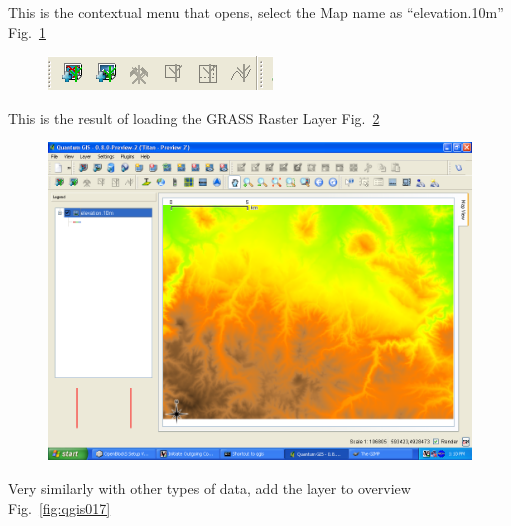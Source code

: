 This is the contextual menu that opens, select the Map name as
``elevation.10m'' Fig.~\ref{fig:qgis015}

\begin{figure}[htbp]
   \centering
   \includegraphics[scale=0.85]{qgis015.png}
   \caption{}
   \label{fig:qgis015}
\end{figure}
 

This is the result of loading the GRASS Raster Layer Fig.~\ref{fig:qgis016}

\begin{figure}[htbp]
   \centering
   \includegraphics[scale=0.2]{qgis016.png}
   \caption{}
   \label{fig:qgis016}
\end{figure}

Very similarly with other types of data, add the layer to overview Fig.~\ref{fig:qgis017}

